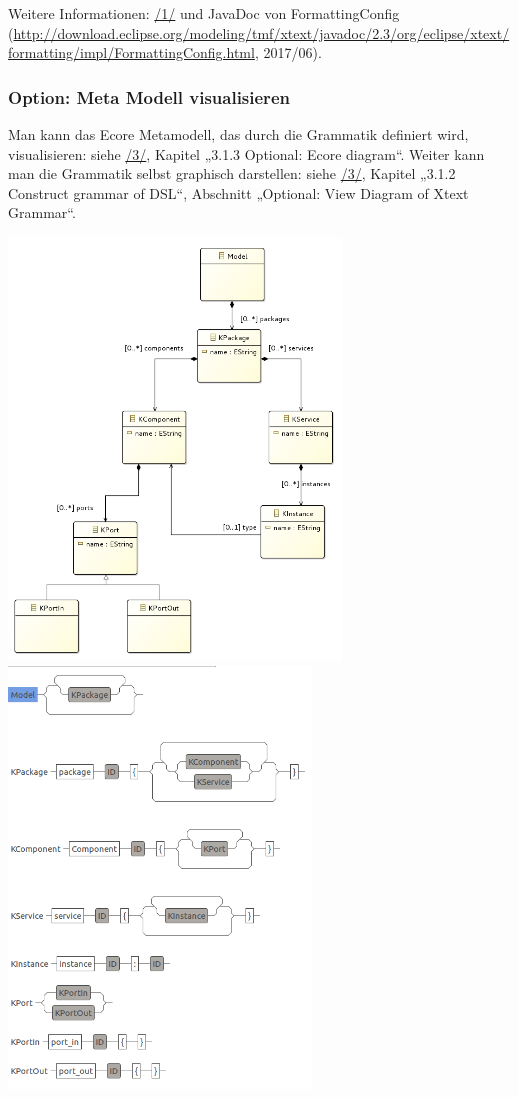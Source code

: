 \documentclass[]{article}
\begin{document}
Weitere Informationen: \protect\hyperlink{anchor-1}{/1/} und JavaDoc von
FormattingConfig
(\url{http://download.eclipse.org/modeling/tmf/xtext/javadoc/2.3/org/eclipse/xtext/formatting/impl/FormattingConfig.html},
2017/06).

\subsubsection{Option: Meta Modell
visualisieren}\label{option-meta-modell-visualisieren}

Man kann das Ecore Metamodell, das durch die Grammatik definiert wird,
visualisieren: siehe \protect\hyperlink{anchor-3}{/3/}, Kapitel „3.1.3
Optional: Ecore diagram``. Weiter kann man die Grammatik selbst
graphisch darstellen: siehe \protect\hyperlink{anchor-3}{/3/}, Kapitel
„3.1.2 Construct grammar of DSL``, Abschnitt „Optional: View Diagram of
Xtext Grammar``.

\includegraphics[width=3.48070in,height=4.41890in]{./Pictures/10000201000002670000030DFC51453B7F2AE519.png}\includegraphics[width=3.16730in,height=4.41340in]{./Pictures/1000020100000220000002F6794AA4A4B50FC707.png}
\end{document}
